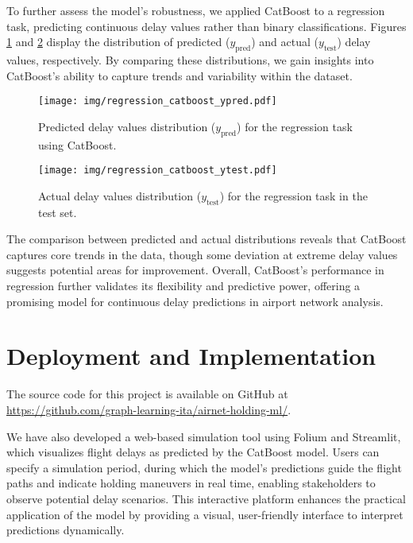 To further assess the model's robustness, we applied CatBoost to a
regression task, predicting continuous delay values rather than binary
classifications. Figures \ref{fig:y_pred} and \ref{fig:y_test} display
the distribution of predicted ($y_\text{pred}$) and actual
($y_\text{test}$) delay values, respectively. By comparing these
distributions, we gain insights into CatBoost’s ability to capture
trends and variability within the dataset.

\begin{figure}[!htbp]
    \centering
    \texttt{[image: img/regression\_catboost\_ypred.pdf]}
    \caption{Predicted delay values distribution ($y_\text{pred}$) for
    the regression task using CatBoost.}
    \label{fig:y_pred}
\end{figure}

\begin{figure}[!htbp]
    \centering
    \texttt{[image: img/regression\_catboost\_ytest.pdf]}
    \caption{Actual delay values distribution ($y_\text{test}$) for
    the regression task in the test set.}
    \label{fig:y_test}
\end{figure}

The comparison between predicted and actual distributions reveals that
CatBoost captures core trends in the data, though some deviation at
extreme delay values suggests potential areas for
improvement. Overall, CatBoost’s performance in regression further
validates its flexibility and predictive power, offering a promising
model for continuous delay predictions in airport network analysis.

\section{Deployment and Implementation}

The source code for this project is available on GitHub at
\url{https://github.com/graph-learning-ita/airnet-holding-ml/}.

We have also developed a web-based simulation tool using Folium and
Streamlit, which visualizes flight delays as predicted by the CatBoost
model. Users can specify a simulation period, during which the model's
predictions guide the flight paths and indicate holding maneuvers in
real time, enabling stakeholders to observe potential delay
scenarios. This interactive platform enhances the practical
application of the model by providing a visual, user-friendly
interface to interpret predictions dynamically.

